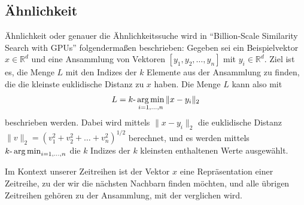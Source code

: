 \subsection{Ähnlichkeit}
Ähnlichkeit oder genauer die Ähnlichkeitssuche wird in "`Billion-Scale Similarity Search with GPUs"' \cite[Ch. 2]{faissAehnlichkeitssuche} folgendermaßen beschrieben: Gegeben sei ein Beispielvektor $x \in \mathbb{R}^d$ und eine Ansammlung von Vektoren $[y_1,y_2,\ldots,y_n]$ mit $y_i \in \mathbb{R}^d$. Ziel ist es, die Menge $L$ mit den Indizes der $k$ Elemente aus der Ansammlung zu finden, die die kleinste euklidische Distanz zu $x$ haben. Die Menge $L$ kann also mit
\[L= k \text{-}\operatorname*{arg\,min}_{i=1,\ldots,n}\|x-y_i\|_2\]
beschrieben werden. Dabei wird mittels $\|x-y_i\|_2$ die euklidische Distanz \\ $\|v\|_2 = (v_1^2+v_2^2+ \ldots +v_n^2)^{1/2}$ berechnet, und es werden mittels $k\text{-}\operatorname*{arg\,min}_{i=1,\ldots,n}$ die $k$ Indizes der $k$ kleinsten enthaltenen Werte ausgewählt.

Im Kontext unserer Zeitreihen ist der Vektor $x$ eine Repräsentation einer Zeitreihe, zu der wir die nächsten Nachbarn finden möchten, und alle übrigen Zeitreihen gehören zu der Ansammlung, mit der verglichen wird.